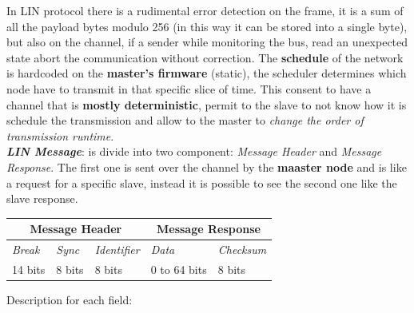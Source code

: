 In LIN protocol there is a rudimental error detection on the frame, it is a sum of all the payload bytes modulo 256 (in this way it can be stored into a single byte), but also on the channel, if a sender while monitoring the bus, read an unexpected state abort the communication without correction. The \textbf{schedule} of the network is hardcoded on the \textbf{master's firmware} (static), the scheduler determines which node have to transmit in that specific slice of time. This consent to have a channel that is \textbf{mostly deterministic}, permit to the slave to not know how it is schedule the transmission and allow to the master to \textit{change the order of transmission runtime}. \\ \newline
\textbf{\textit{LIN Message}}: is divide into two component: \textit{Message Header} and \textit{Message Response}. The first one is sent over the channel by the \textbf{maaster node} and is like a request for a specific slave, instead it is possible to see the second one like the slave response.
\begin{center}
    \begin{tabular}{ | p{2cm} | p{1cm} | p{2cm} | p{5cm} | p{2cm} | } \hline
        \multicolumn{3}{|c|}{\textbf{Message Header}} & \multicolumn{2}{|c|}{\textbf{Message Response}} \\ \hline
        \textit{Break} & \textit{Sync} & \textit{Identifier} & \textit{Data} & \textit{Checksum} \\ \hline
        14 bits & 8 bits & 8 bits & 0 to 64 bits & 8 bits \\ \hline
    \end{tabular}
\end{center}
Description for each field:
